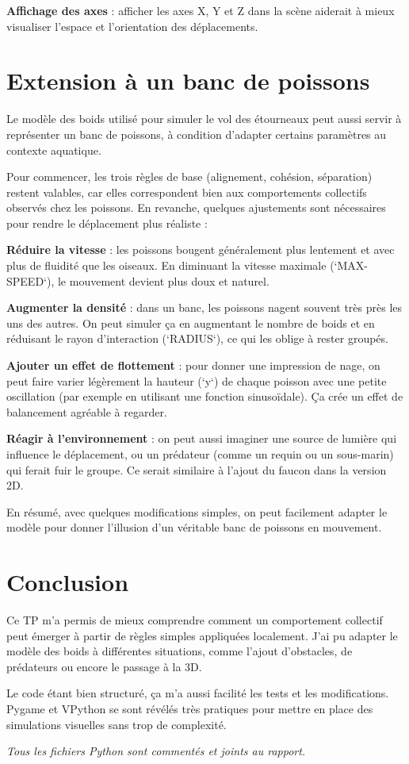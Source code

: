 \documentclass{article}
\begin{document}
\textbf{Affichage des axes} : afficher les axes X, Y et Z dans la scène aiderait à mieux visualiser l’espace et l’orientation des déplacements.

\section{Extension à un banc de poissons}
Le modèle des boids utilisé pour simuler le vol des étourneaux peut aussi servir à représenter un banc de poissons, à condition d’adapter certains paramètres au contexte aquatique.

Pour commencer, les trois règles de base (alignement, cohésion, séparation) restent valables, car elles correspondent bien aux comportements collectifs observés chez les poissons. En revanche, quelques ajustements sont nécessaires pour rendre le déplacement plus réaliste :

\textbf{Réduire la vitesse} : les poissons bougent généralement plus lentement et avec plus de fluidité que les oiseaux. En diminuant la vitesse maximale (`MAX-SPEED`), le mouvement devient plus doux et naturel.

\textbf{Augmenter la densité} : dans un banc, les poissons nagent souvent très près les uns des autres. On peut simuler ça en augmentant le nombre de boids et en réduisant le rayon d’interaction (`RADIUS`), ce qui les oblige à rester groupés.

\textbf{Ajouter un effet de flottement} : pour donner une impression de nage, on peut faire varier légèrement la hauteur (`y`) de chaque poisson avec une petite oscillation (par exemple en utilisant une fonction sinusoïdale). Ça crée un effet de balancement agréable à regarder.

\textbf{Réagir à l’environnement} : on peut aussi imaginer une source de lumière qui influence le déplacement, ou un prédateur (comme un requin ou un sous-marin) qui ferait fuir le groupe. Ce serait similaire à l’ajout du faucon dans la version 2D.

En résumé, avec quelques modifications simples, on peut facilement adapter le modèle pour donner l’illusion d’un véritable banc de poissons en mouvement.

\section{Conclusion}
Ce TP m’a permis de mieux comprendre comment un comportement collectif peut émerger à partir de règles simples appliquées localement. J’ai pu adapter le modèle des boids à différentes situations, comme l’ajout d’obstacles, de prédateurs ou encore le passage à la 3D.

Le code étant bien structuré, ça m’a aussi facilité les tests et les modifications. Pygame et VPython se sont révélés très pratiques pour mettre en place des simulations visuelles sans trop de complexité.

\textit{Tous les fichiers Python sont commentés et joints au rapport.}
\end{document}
